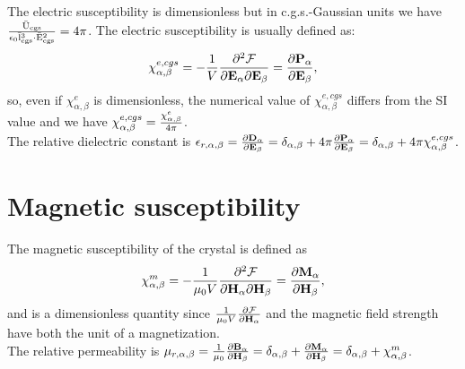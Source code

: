 \documentclass[12pt,a4paper,twoside]{report}
\begin{document}
{\color{orange} The electric susceptibility is dimensionless but
in c.g.s.-Gaussian units we have
${{\rm \bar U_{cgs}} \over \epsilon_0 {\rm \bar l_{cgs}}^3 \cdot 
{\rm \bar E_{cgs}}^2}=4\pi$. 
The electric susceptibility is usually defined as:
\begin{equation}
\chi^{e,cgs}_{\alpha,\beta}=-{1\over V} 
{\partial^2 \mathcal{F} \over \partial 
{\bf E}_{\alpha} \partial {\bf E}_{\beta}}=
{\partial {\bf P}_\alpha \over \partial {\bf E}_\beta}, 
\end{equation}
so, even if $\chi^e_{\alpha,\beta}$ is dimensionless,  
the numerical value of $\chi^{e,cgs}_{\alpha,\beta}$ differs from the
SI value and we have
$\chi^{e,cgs}_{\alpha,\beta} = {\chi^e_{\alpha,\beta} \over 4 \pi}$. \\
The relative dielectric constant is $\epsilon_{r,\alpha,\beta}=
{\partial {\bf D}_{\alpha} \over \partial {\bf E}_{\beta}}=
\delta_{\alpha,\beta} 
+4 \pi {\partial {\bf P}_\alpha \over \partial {\bf E}_\beta} = 
\delta_{\alpha,\beta} + 
4\pi \chi^{e,cgs}_{\alpha,\beta}$.
}

\newpage
{\color{coral}\section{Magnetic susceptibility}}
\color{black}

The magnetic susceptibility of the crystal is defined as
\begin{equation}
\chi^m_{\alpha,\beta}=-{1\over \mu_0 V} 
{\partial^2 \mathcal{F} \over \partial 
{\bf H}_{\alpha} \partial {\bf H}_{\beta}}=
{\partial {\bf M}_{\alpha} \over \partial {\bf H}_{\beta}},
\end{equation}
and is a dimensionless quantity since ${1\over \mu_0 V}
{\partial \mathcal{F} \over \partial 
{\bf H}_{\alpha}}$ and the magnetic field strength have
both the unit of a magnetization.\\
The relative permeability is $\mu_{r,\alpha,\beta}=
{1\over \mu_0} {\partial {\bf B}_{\alpha} \over \partial {\bf H}_\beta}=
\delta_{\alpha,\beta} 
+{\partial {\bf M}_\alpha \over \partial {\bf H}_\beta} = 
\delta_{\alpha,\beta} + 
\chi^m_{\alpha,\beta}$.
\\
\end{document}
